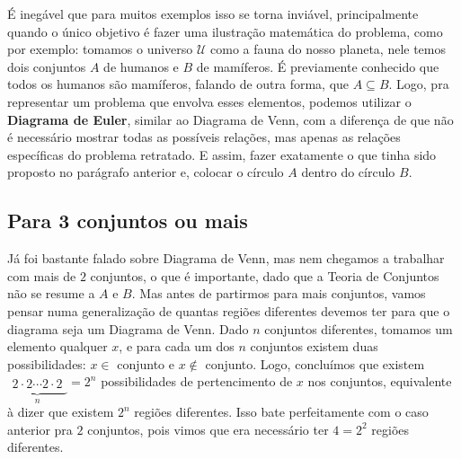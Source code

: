   
  É inegável que para muitos exemplos isso se torna inviável, principalmente quando o único objetivo é fazer uma ilustração matemática do problema, como por exemplo: tomamos o universo $\mathcal U$ como a fauna do nosso planeta, nele temos dois conjuntos $A$ de humanos e $B$ de mamíferos. É previamente conhecido que todos os humanos são mamíferos, falando de outra forma, que $A \subseteq B$. Logo, pra representar um problema que envolva esses elementos, podemos utilizar o \textbf{Diagrama de Euler}, similar ao Diagrama de Venn, com a diferença de que não é necessário mostrar todas as possíveis relações, mas apenas as relações específicas do problema retratado. E assim, fazer exatamente o que tinha sido proposto no parágrafo anterior e, colocar o círculo $A$ dentro do círculo $B$.


  \subsection{Para 3 conjuntos ou mais}    
  Já foi bastante falado sobre Diagrama de Venn, mas nem chegamos a trabalhar com mais de $2$ conjuntos, o que é importante, dado que a Teoria de Conjuntos não se resume a $A$ e $B$. Mas antes de partirmos para mais conjuntos, vamos pensar numa generalização de quantas regiões diferentes devemos ter para que o diagrama seja um Diagrama de Venn. Dado $n$ conjuntos diferentes, tomamos um elemento qualquer $x$, e para cada um dos $n$ conjuntos existem duas possibilidades: $x \in $ conjunto e $x \notin $ conjunto. Logo, concluímos que existem $\underbrace{\begin{matrix} 2\cdot2\cdots2\cdot2\end{matrix}}_{n} = 2^n$ possibilidades de pertencimento de $x$ nos conjuntos, equivalente à dizer que existem $2^n$ regiões diferentes. Isso bate perfeitamente com o caso anterior pra $2$ conjuntos, pois vimos que era necessário ter $4=2^2$ regiões diferentes.

